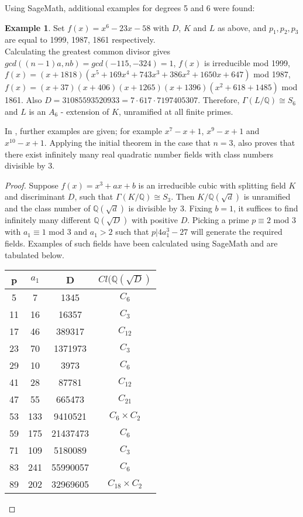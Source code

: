 \documentclass[12pt]{extarticle}
\newcommand{\Q}{\mathbb{Q}}
\newcommand{\<}{\langle}
\renewcommand{\>}{\rangle}
\theoremstyle{definition}
\newtheorem*{example}{Example}
\begin{document}
Using SageMath, additional examples for degrees 5 and 6 were found:
\begin{example}
Set $f(x)= x^6-23x-58$ with $D$, $K$ and $L$ as above, and $p_1,p_2,p_3$ are equal to 1999, 1987, 1861 respectively. \\
Calculating the greatest common divisor gives $gcd((n-1)a,nb) = gcd(-115,-324)=1$, $f(x)$ is irreducible mod 1999, \\$f(x)=(x + 1818)(x^5 + 169x^4 + 743x^3+386x^2+1650x+647)$ mod 1987, \\$f(x)=(x + 37)(x + 406)(x + 1265)(x+1396)(x^2 + 618 + 1485)$ mod 1861. Also $D = 31085593520933 = 7 \cdot 617 \cdot 7197405307$. Therefore, $\Gamma(L/\Q) \cong S_6$ and $L$ is an $A_6$ - extension of $K$, unramified at all finite primes.
\end{example}
In \cite{uchida1970}, further examples are given; for example $x^7-x+1$, $x^9-x+1$ and $x^{10}-x+1$. 
Applying the initial theorem in the case that $n=3$, \cite{uchida1970} also proves that there exist infinitely many real quadratic number fields with class numbers divisible by 3. 
\begin{proof}
Suppose $f(x) = x^3+ax+b$ is an irreducible cubic with splitting field $K$ and discriminant $D$, such that $\Gamma(K/\Q) \cong S_3$. Then $K/\Q(\sqrt{d})$ is unramified and the class number of $\Q(\sqrt{d})$ is divisible by 3.  Fixing $b=1$, it suffices to find infinitely many different $\Q(\sqrt{D})$ with positive $D$. Picking a prime $p \equiv 2$ mod 3 with $a_1 \equiv 1$ mod 3 and $a_1 > 2$ such that $p | 4a_1^3 - 27$ will generate the required fields. Examples of such fields have been calculated using SageMath and are tabulated below.
\begin{center}
 \begin{tabular}{| c | c | c | c |}
 \hline
p & $a_1$ & D & $Cl(\Q(\sqrt{D})$  \\ 
\hline
5 &  7 & 1345 & $C_{6}$ \\
\hline
11 &  16 & 16357 & $C_{3}$ \\
\hline
17 &  46 & 389317 & $C_{12}$ \\
\hline
23 &  70 & 1371973 & $C_{3}$ \\
\hline
29 &  10 & 3973 & $C_{6}$ \\
\hline
41 &  28 & 87781 & $C_{12}$ \\
\hline
47 &  55 & 665473 & $C_{21}$ \\
\hline
53 &  133 & 9410521 & $C_{6} \times C_{2}$ \\
\hline
59 &  175 & 21437473 & $C_{6}$ \\
\hline
71 &  109 & 5180089 & $C_{3}$ \\
\hline
83 &  241 & 55990057 & $C_{6}$ \\
\hline
89 &  202 & 32969605 & $C_{18} \times C_{2}$ \\
\hline
\end{tabular}
\end{center}
\end{proof}
\end{document}

